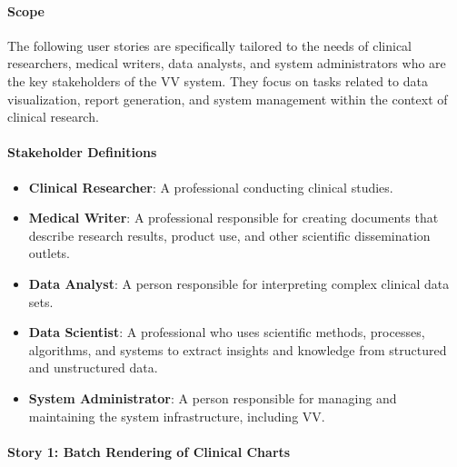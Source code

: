 \paragraph{Scope}\label{scope}

The following user stories are specifically tailored to the needs of
clinical researchers, medical writers, data analysts, and system
administrators who are the key stakeholders of the VV system. They focus
on tasks related to data visualization, report generation, and system
management within the context of clinical research.

\paragraph{Stakeholder Definitions}\label{stakeholder-definitions}

\begin{itemize}
\item
  \textbf{Clinical Researcher}: A professional conducting clinical
  studies.
\item
  \textbf{Medical Writer}: A professional responsible for creating
  documents that describe research results, product use, and other
  scientific dissemination outlets.
\item
  \textbf{Data Analyst}: A person responsible for interpreting complex
  clinical data sets.
\item
  \textbf{Data Scientist}: A professional who uses scientific methods,
  processes, algorithms, and systems to extract insights and knowledge
  from structured and unstructured data.
\item
  \textbf{System Administrator}: A person responsible for managing and
  maintaining the system infrastructure, including VV.
\end{itemize}

\paragraph{Story 1: Batch Rendering of Clinical
Charts}\label{story-1-batch-rendering-of-clinical-charts}

